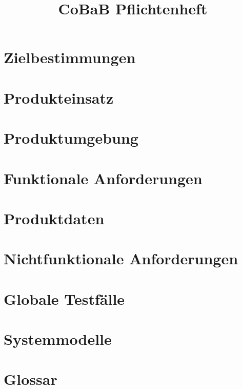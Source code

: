 \documentclass[parskip=full]{scrartcl}
\title{CoBaB Pflichtenheft}
\begin{document}
\maketitle

\section{Zielbestimmungen}


\section{Produkteinsatz}


\section{Produktumgebung}


\section{Funktionale Anforderungen}


\section{Produktdaten}


\section{Nichtfunktionale Anforderungen}


\section{Globale Testf\"alle}


\section{Systemmodelle}


\section{Glossar}

\end{document}
